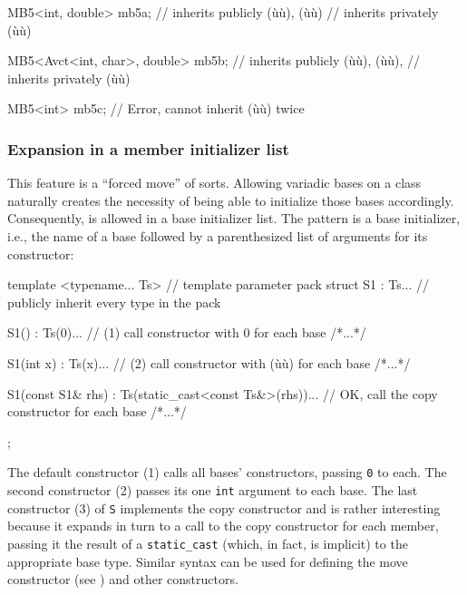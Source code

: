 \begin{emcppslisting}[emcppsbatch=e28]
MB5<int, double> mb5a;
    // inherits publicly (ù{}ù), (ù{}ù)
    // inherits privately (ù{}ù)

MB5<Avct<int, char>, double> mb5b;
    // inherits publicly (ù{}ù), (ù{}ù),
    // inherits privately (ù{}ù)

MB5<int> mb5c;
    // Error, cannot inherit (ù{}ù) twice
\end{emcppslisting}

\subsubsection[Expansion in a member initializer list]{Expansion in a member initializer list}\label{expansion-in-a-member-initializer-list}

This feature is a ``forced move'' of sorts. Allowing variadic bases on a
class naturally creates the necessity of being able to initialize those
bases accordingly. Consequently,  is
allowed in a base initializer list. The pattern is a base initializer,
i.e., the name of a base followed by a parenthesized list of arguments
for its constructor:

\begin{emcppslisting}[emcppsbatch=e29]
template <typename... Ts>  // template parameter pack
struct S1 : Ts...           // publicly inherit every type in the pack
{
    S1() : Ts(0)...         // (1) call constructor with 0 for each base
    { /*...*/ }

    S1(int x) : Ts(x)...    // (2) call constructor with (ù{}ù) for each base
    { /*...*/ }

    S1(const S1& rhs) : Ts(static_cast<const Ts&>(rhs))...
        // OK, call the copy constructor for each base
    { /*...*/ }
};
\end{emcppslisting}
    

\noindent The default constructor (1) calls all bases' constructors, passing
\lstinline!0! to each. The second constructor (2) passes its one
\lstinline!int! argument to each base. The last constructor (3) of
\lstinline!S! implements the copy constructor and is rather interesting
because it expands in turn to a call to the copy constructor for each
member, passing it the result of a \lstinline!static_cast! (which, in
fact, is implicit) to the appropriate base type. Similar syntax can be
used for defining the move constructor (see ) and
other constructors.

